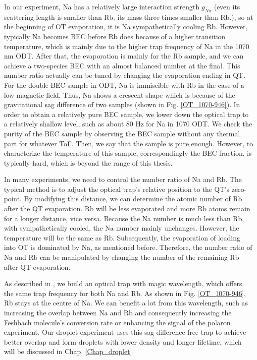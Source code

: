 In our experiment, Na has a relatively large interaction strength $g_{Na}$ (even its scattering length is smaller than Rb, its mass three times smaller than Rb.), so at the beginning of OT evaporation, it is Na sympathetically cooling Rb. However, typically Na becomes BEC before Rb does because of a higher transition temperature, which is mainly due to the higher trap frequency of Na in the 1070 nm ODT. After that, the evaporation is mainly for the Rb sample, and we can achieve a two-species BEC with an almost balanced number at the final. This number ratio actually can be tuned by changing the evaporation ending in QT. For the double BEC sample in ODT, Na is immiscible with Rb in the case of a low magnetic field. Thus, Na shows a crescent shape which is because of the gravitational sag difference of two samples (shown in Fig. \ref{OT_1070-946}). In order to obtain a relatively pure BEC sample, we lower down the optical trap to a relatively shallow level, such as about 80 Hz for Na in 1070 ODT. We check the purity of the BEC sample by observing the BEC sample without any thermal part for whatever ToF. Then, we say that the sample is pure enough. However, to characterize the temperature of this sample, correspondingly the BEC fraction, is typically hard, which is beyond the range of this thesis.

In many experiments, we need to control the number ratio of Na and Rb. The typical method is to adjust the optical trap's relative position to the QT's zero-point. By modifying this distance, we can determine the atomic number of Rb after the QT evaporation. Rb will be less evaporated and more Rb atoms remain for a longer distance, vice versa. Because the Na number is much less than Rb, with sympathetically cooled, the Na number mainly unchanges. However, the temperature will be the same as Rb. Subsequently, the evaporation of loading into OT is dominated by Na, as mentioned before. Therefore, the number ratio of Na and Rb can be manipulated by changing the number of the remaining Rb after QT evaporation.

As described in \cite{LiLintao2021}, we build an optical trap with magic wavelength, which offers the same trap frequency for both Na and Rb. As shown in Fig. \ref{OT_1070-946}, Rb stays at the centre of Na. We can benefit a lot from this wavelength, such as increasing the overlap between Na and Rb and consequently increasing the Feshbach molecule's conversion rate or enhancing the signal of the polaron experiment. Our droplet experiment uses this sag-difference-free trap to achieve better overlap and form droplets with lower density and longer lifetime, which will be discussed in Chap. \ref{Chap_droplet}.

